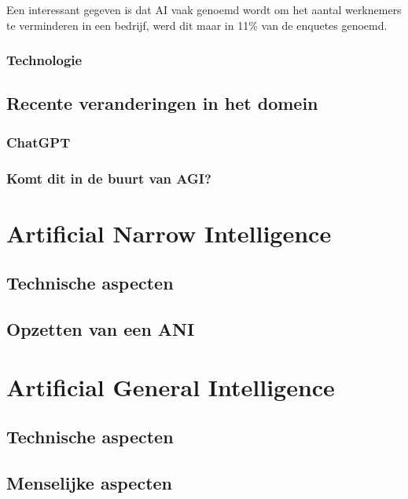 Een interessant gegeven is dat AI vaak genoemd wordt om het aantal werknemers te verminderen in een bedrijf, werd dit maar in 11\% van de enquetes genoemd.

\subsubsection{Technologie}

\subsection{Recente veranderingen in het domein}

\subsubsection{ChatGPT}

\subsubsection{Komt dit in de buurt van AGI?}

\section{Artificial Narrow Intelligence}

\subsection{Technische aspecten}

\subsection{Opzetten van een ANI}

\section{Artificial General Intelligence}

\subsection{Technische aspecten}

\subsection{Menselijke aspecten}



